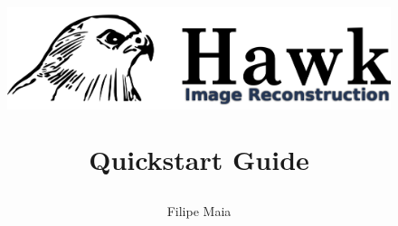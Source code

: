 \documentclass[a4paper]{article}
\begin{document}









\title{
\vspace*{-1in}
\begin{figure}[!h]
\includegraphics[width=15cm]{Hawk2.png}
\label{hawk-cover}
\end{figure}
\vspace {0.5in}
{\fontsize{30}{40}\selectfont \textbf{Quickstart Guide} }}
\author {\huge Filipe Maia}


\maketitle
\end{document}
